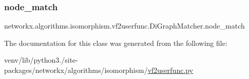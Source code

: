 \subsubsection{\texorpdfstring{node\+\_\+match}{node\_match}}
{\footnotesize\ttfamily networkx.\+algorithms.\+isomorphism.\+vf2userfunc.\+Di\+Graph\+Matcher.\+node\+\_\+match}



The documentation for this class was generated from the following file\+:\begin{DoxyCompactItemize}
\item 
venv/lib/python3./site-\/packages/networkx/algorithms/isomorphism/\hyperlink{vf2userfunc_8py}{vf2userfunc.\+py}\end{DoxyCompactItemize}
